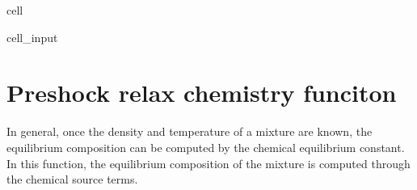 \documentclass[letterpaper,10pt,english]{jupyterBook}
\begin{document}
\begin{sphinxuseclass}{cell}
\begin{sphinxVerbatimInput}
\begin{sphinxuseclass}{cell_input}
\begin{sphinxVerbatim}[commandchars=\\\{\}]
                            
                
                           
                    
                
                
         
    
     
          
    
      

  
\end{sphinxVerbatim}

\end{sphinxuseclass}\end{sphinxVerbatimInput}

\end{sphinxuseclass}

\section{Pre\sphinxhyphen{}shock relax chemistry funciton}
\label{\detokenize{1_Temperature/Problem_class_definition:pre-shock-relax-chemistry-funciton}}
\sphinxAtStartPar
In general, once the density and temperature of a mixture are known, the equilibrium composition can be computed by the chemical equilibrium constant. In this function, the equilibrium composition of the mixture is computed through the chemical source terms.
\end{document}
